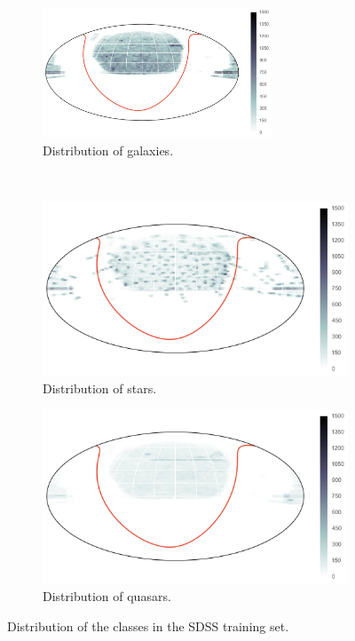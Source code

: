 \begin{figure}[p]
	\centering
	\begin{subfigure}{\textwidth}
		\centering
		\includegraphics[width=0.75\textwidth]{figures/map_train_galaxies}
		\caption{Distribution of galaxies.}
		\label{fig:orbit1}
	\end{subfigure}\\
	\begin{subfigure}{\textwidth}
		\centering
		\includegraphics[width=0.75\linewidth]{figures/map_train_stars}
		\caption{Distribution of stars.}
		\label{fig:orbit2}
	\end{subfigure}
	\begin{subfigure}{\textwidth}
		\centering
		\includegraphics[width=0.75\linewidth]{figures/map_train_quasars}
		\caption{Distribution of quasars.}
		\label{fig:orbit3}
	\end{subfigure}
	\caption{Distribution of the classes in the SDSS training set.}
	\label{fig:orbit}
\end{figure}


